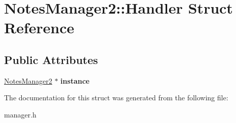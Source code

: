 \hypertarget{struct_notes_manager2_1_1_handler}{}\section{Notes\+Manager2\+:\+:Handler Struct Reference}
\label{struct_notes_manager2_1_1_handler}
\subsection*{Public Attributes}
\begin{DoxyCompactItemize}
\item 
\mbox{\label{struct_notes_manager2_1_1_handler_a750fdd418013c56b7f49dc2227d41fec}} 
\hyperlink{class_notes_manager2}{Notes\+Manager2} $\ast$ {\bfseries instance}
\end{DoxyCompactItemize}


The documentation for this struct was generated from the following file\+:\begin{DoxyCompactItemize}
\item 
manager.\+h\end{DoxyCompactItemize}
